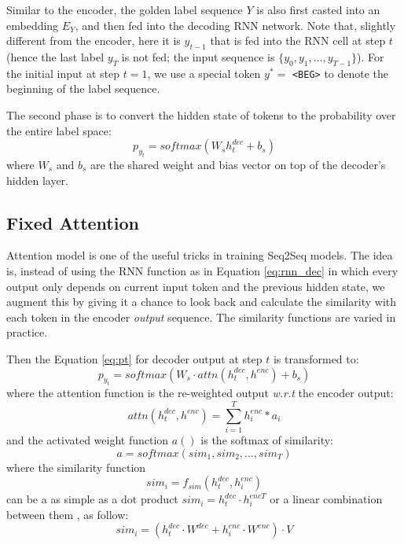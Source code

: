 \documentclass[11pt,a4paper]{article}
\begin{document}
Similar to the encoder, the golden label sequence $Y$ is also first casted into an embedding $E_Y$, and then fed into the decoding RNN network. Note that, slightly different from the encoder, here it is $y_{t-1}$ that is fed into the RNN cell at step $t$ (hence the last label $y_{T}$ is not fed; the input sequence is $\{y_0, y_1, \dots, y_{T-1}\}$). For the initial input at step $t = 1$, we use a special token $y^* =$ \texttt{<BEG>} to denote the beginning of the label sequence.

The second phase is to convert the hidden state of tokens to the probability over the entire label space: 
  \begin{equation}
      p_{y_t} = softmax(W_{s} h^{dec}_t + b_{s}) \label{eq:pt}
  \end{equation}
where $W_{s}$ and $b_{s}$ are the shared weight and bias vector on top of the decoder's hidden layer. 

\subsection{Fixed Attention} \label{ssec:atten}
Attention model \cite{bahdanau2014neural,luong2015effective} is one of the useful tricks in training Seq2Seq models. The idea is, instead of using the RNN function as in Equation \ref{eq:rnn_dec} in which every output only depends on current input token and the previous hidden state, we augment this by giving it a chance to look back and calculate the similarity with each token in the encoder \textit{output} sequence. The similarity functions are varied in practice. 

Then the Equation \ref{eq:pt} for decoder output at step $t$ is transformed to: 
  \begin{equation}
      p_{y_t} = softmax(W_{s} \cdot attn(h^{dec}_t, h^{enc}) + b_{s}) \label{eq:pt_attn}
  \end{equation}
where the attention function is the re-weighted output \textit{w.r.t} the encoder output: 
  \begin{equation}
	  attn(h^{dec}_t, h^{enc}) = \sum^{T}_{i=1} h^{enc}_i * a_i \label{eq:attn}
  \end{equation}
and the activated weight function $a()$ is the softmax of similarity: 
  \begin{equation}
	  a = softmax(sim_1, sim_2, \dots, sim_T) \label{eq:a}
  \end{equation}
where the similarity function
  \begin{equation}
	sim_i = f_{sim}(h^{dec}_t, h^{enc}_i)
  \end{equation}
can be a as simple as a dot product $sim_i = h^{dec}_t \cdot h^{encT}_i $ \cite{luong2015effective} or a linear combination between them \cite{bahdanau2014neural}, as follow:  
  \begin{equation}
  	sim_i = (h^{dec}_t \cdot W^{dec} + h^{enc}_i \cdot W^{enc}) \cdot V
  \end{equation}
  
\end{document}
